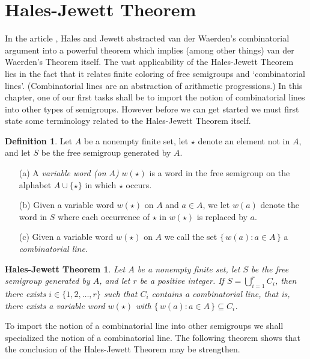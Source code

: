\documentclass[12pt,showtrims]{memoir}
\theoremstyle{plain}
\newtheorem{hj}[thm]{Hales-Jewett Theorem}
\theoremstyle{definition}
\newtheorem{defn}[thm]{Definition}
\begin{document}
\addtolength{\baselineskip}{1.7pt}
\section{Hales-Jewett Theorem}
In the article \cite{Hales:1963fk}, Hales and Jewett abstracted van der Waerden's combinatorial argument into a powerful theorem which implies (among other things) van der Waerden's Theorem itself. 
The vast applicability of the Hales-Jewett Theorem lies in the fact that it relates finite coloring of free semigroups and `combinatorial lines'. 
(Combinatorial lines are an abstraction of arithmetic progressions.)
In this chapter, one of our first tasks shall be to import the notion of combinatorial lines into other types of semigroups. 
However before we can get started we must first state some terminology related to the Hales-Jewett Theorem itself.

\begin{defn}
  Let $A$ be a nonempty finite set, let $\star$ denote an element not in $A$, and let $S$ be the free semigroup generated by $A$.
  \begin{itemize}
    \item[(a)] 
      A \emph{variable word (on $A$)} $w(\star)$ is a word in the  free semigroup on the alphabet $A \cup \{\star\}$ in which $\star$ occurs.

    \item[(b)] 
      Given a variable word $w(\star)$ on $A$ and $a \in A$, we let $w(a)$ denote the word in $S$ where each occurrence of $\star$ in $w(\star)$ is replaced by $a$.

    \item[(c)] 
      Given a variable word $w(\star)$ on $A$ we call the set $\{\, w(a) : a \in A \,\}$ a \emph{combinatorial line}.
  \end{itemize}
\end{defn}

\begin{hj}
  Let $A$ be a nonempty finite set, let $S$ be the free semigroup generated by $A$, and let $r$ be a positive integer.
  If $S = \bigcup_{i=1}^r C_i$, then there exists $i \in \{1, 2, \ldots, r\}$ such that $C_i$ contains a combinatorial line, that is, there exists a variable word $w(\star)$ with $\bigl\{\, w(a) : a \in A \,\bigr\} \subseteq C_i$.
\end{hj}

To import the notion of a combinatorial line into other semigroups we shall specialized the notion of a combinatorial line.
The following theorem shows that the conclusion of the Hales-Jewett Theorem may be strengthen. 
\end{document}
